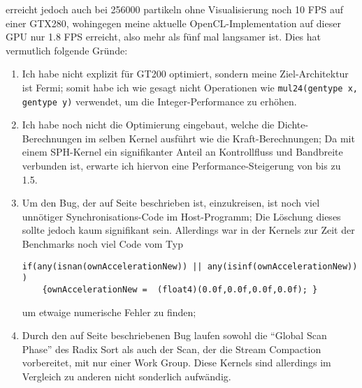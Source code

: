 	\cite{Goswami2010} erreicht jedoch auch bei 256000 partikeln ohne Visualisierung noch 10 FPS auf einer GTX280,
	wohingegen meine aktuelle OpenCL-Implementation auf dieser GPU nur 1.8 FPS erreicht, 
	also mehr als fünf mal langsamer ist.
	Dies hat vermutlich folgende Gründe:
	\begin{enumerate}
		\item Ich habe nicht explizit für GT200 optimiert, sondern meine Ziel-Architektur ist Fermi;
		somit habe ich wie gesagt nicht Operationen wie \lstinline|mul24(gentype x, gentype y)| verwendet,
		um die Integer-Performance zu erhöhen.
		\item Ich habe noch nicht die Optimierung eingebaut, welche die Dichte-Berechnungen im selben
		Kernel ausführt wie die Kraft-Berechnungen; Da mit einem SPH-Kernel ein signifikanter 
		Anteil an Kontrollfluss und	Bandbreite verbunden ist, erwarte ich hiervon eine Performance-Steigerung von 
		bis zu 1.5.
		\item Um den Bug, der auf Seite \pageref{enum:oclSyncBug} beschrieben ist, einzukreisen, ist noch viel unnötiger 
		Synchronisations-Code im Host-Programm; Die Löschung dieses sollte jedoch kaum signifikant sein.
		Allerdings war in der Kernels zur Zeit der Benchmarks noch viel Code vom Typ
		\begin{lstlisting}
if(any(isnan(ownAccelerationNew)) || any(isinf(ownAccelerationNew)) ) 
	{ownAccelerationNew =  (float4)(0.0f,0.0f,0.0f,0.0f); }
		\end{lstlisting}
		um etwaige numerische Fehler zu finden; 
		
		\item
		Durch den auf Seite \pageref{enum:oclSyncBug} beschriebenen Bug laufen sowohl die "`Global Scan Phase"'
		des Radix Sort als auch der Scan, der die Stream Compaction vorbereitet, mit nur einer Work Group.
		Diese Kernels sind allerdings im Vergleich zu anderen nicht sonderlich aufwändig.
		

\end{enumerate}
